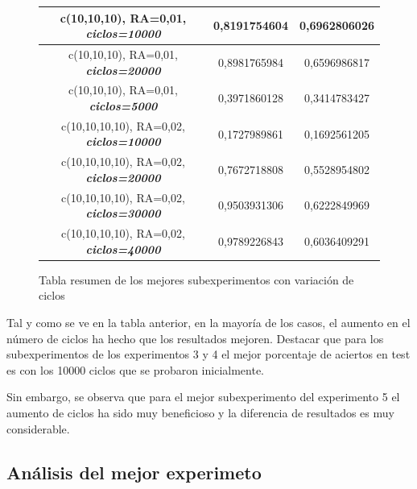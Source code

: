 \documentclass{uc3mpracticas}
\begin{document}
\begin{figure}[!h]
\begin{center}
\begin{tabular}{|c|c|c|}
        \rowcolor{LightGreen}
        c(10,10,10), RA=0,01, \textit{\textbf{ciclos=10000}}              &  0,8191754604                         &  0,6962806026     \\ \hline
        c(10,10,10), RA=0,01, \textit{\textbf{ciclos=20000}}              &  0,8981765984                         &  0,6596986817     \\ \hline
        c(10,10,10), RA=0,01, \textit{\textbf{ciclos=5000}}               &  0,3971860128                         &  0,3414783427     \\ \hline \hline \hline

        c(10,10,10,10), RA=0,02, \textit{\textbf{ciclos=10000}}           &  0,1727989861                         &  0,1692561205     \\ \hline
        c(10,10,10,10), RA=0,02, \textit{\textbf{ciclos=20000}}           &  0,7672718808                         &  0,5528954802     \\ \hline
        \rowcolor{LightCyan}
        c(10,10,10,10), RA=0,02, \textit{\textbf{ciclos=30000}}           &  0,9503931306                         &  0,6222849969     \\ \hline
        c(10,10,10,10), RA=0,02, \textit{\textbf{ciclos=40000}}           &  0,9789226843                         &  0,6036409291     \\ \hline
  \end{tabular}
\end{center}
\caption*{Tabla resumen de los mejores subexperimentos con variación de ciclos}
\end{figure}


Tal y como se ve en la tabla anterior, en la mayoría de los casos, el aumento en el número de ciclos ha hecho que los resultados mejoren. Destacar que para los subexperimentos de los experimentos 3 y 4 el mejor porcentaje de aciertos en test es con los 10000 ciclos que se probaron inicialmente.

\vspace{2mm}

Sin embargo, se observa que para el mejor subexperimento del experimento 5 el aumento de ciclos ha sido muy beneficioso y la diferencia de resultados es muy considerable.







\subsection{Análisis del mejor experimeto}
\end{document}
